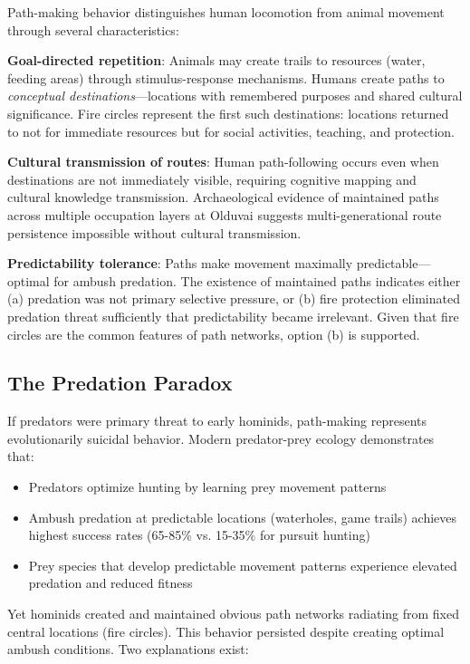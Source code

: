 \documentclass[12pt,a4paper]{article}
\begin{document}
Path-making behavior distinguishes human locomotion from animal movement through several characteristics:

\textbf{Goal-directed repetition}: Animals may create trails to resources (water, feeding areas) through stimulus-response mechanisms. Humans create paths to \textit{conceptual destinations}—locations with remembered purposes and shared cultural significance. Fire circles represent the first such destinations: locations returned to not for immediate resources but for social activities, teaching, and protection.

\textbf{Cultural transmission of routes}: Human path-following occurs even when destinations are not immediately visible, requiring cognitive mapping and cultural knowledge transmission. Archaeological evidence of maintained paths across multiple occupation layers at Olduvai suggests multi-generational route persistence impossible without cultural transmission.

\textbf{Predictability tolerance}: Paths make movement maximally predictable—optimal for ambush predation. The existence of maintained paths indicates either (a) predation was not primary selective pressure, or (b) fire protection eliminated predation threat sufficiently that predictability became irrelevant. Given that fire circles are the common features of path networks, option (b) is supported.

\subsection{The Predation Paradox}

If predators were primary threat to early hominids, path-making represents evolutionarily suicidal behavior. Modern predator-prey ecology demonstrates that:

\begin{itemize}
\item Predators optimize hunting by learning prey movement patterns
\item Ambush predation at predictable locations (waterholes, game trails) achieves highest success rates (65-85\% vs. 15-35\% for pursuit hunting) \citep{schaller1972serengeti}
\item Prey species that develop predictable movement patterns experience elevated predation and reduced fitness
\end{itemize}

Yet hominids created and maintained obvious path networks radiating from fixed central locations (fire circles). This behavior persisted despite creating optimal ambush conditions. Two explanations exist:
\end{document}

